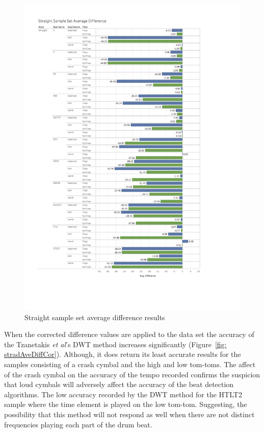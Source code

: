 \documentclass[a4paper, 11pt]{article}
\begin{document}
\begin{figure}[htbp]
\vspace{-1in}
\centering
\includegraphics[scale=0.38]{images/SSSAD.jpg}
\caption{Straight sample set average difference results}
\label{fig: stradAveDiff}
\end{figure}

When the corrected difference values are applied to the data set the accuracy of the Tzanetakis \textit{et al}'s \cite{tzane1} DWT method increases significantly (Figure~\ref{fig: stradAveDiffCor}). Although, it does return its least accurate results for the samples consisting of a crash cymbal and the high and low tom-toms. The affect of the crash cymbal on the accuracy of the tempo recorded confirms the suspicion that loud cymbals will adversely affect the accuracy of the beat detection algorithms. The low accuracy recorded by the DWT method for the HTLT2 sample where the time element is played on the low tom-tom. Suggesting, the possibility that this method will not respond as well when there are not distinct frequencies playing each part of the drum beat. \par
\end{document}
